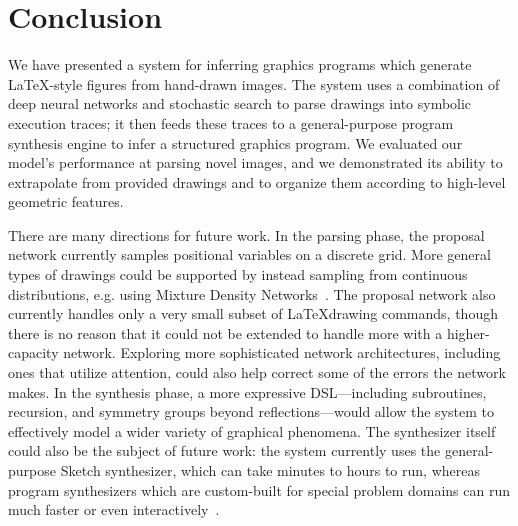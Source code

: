 \documentclass{article}
\newcommand{\remark}[1]{\textcolor{red}{[#1]}}
\begin{document}


\section{Conclusion}

We have presented a system for inferring graphics programs which generate \LaTeX-style figures from hand-drawn images. The system uses a combination of deep neural networks and stochastic search to parse drawings into symbolic execution traces; it then feeds these traces to a general-purpose program synthesis engine to infer a structured graphics program. We evaluated our model's performance at parsing novel images, and we demonstrated its ability to extrapolate from provided drawings and to organize them according to high-level geometric features.

There are many directions for future work. In the parsing phase, the proposal network currently samples positional variables on a discrete grid. More general types of drawings could be supported by instead sampling from continuous distributions, e.g. using Mixture Density Networks~\cite{MDN}. The proposal network also currently handles only a very small subset of \LaTeX drawing commands, though there is no reason that it could not be extended to handle more with a higher-capacity network. Exploring more sophisticated network architectures, including ones that utilize attention, could also help correct some of the errors the network makes.
In the synthesis phase, a more expressive DSL---including subroutines, recursion, and symmetry groups beyond reflections---would allow the system to effectively model a wider variety of graphical phenomena. The synthesizer itself could also be the subject of future work: the system currently uses the general-purpose Sketch synthesizer, which can take minutes to hours to run, whereas program synthesizers which are custom-built for special problem domains can run much faster or even interactively~\cite{le2014flashextract}.
\end{document}
